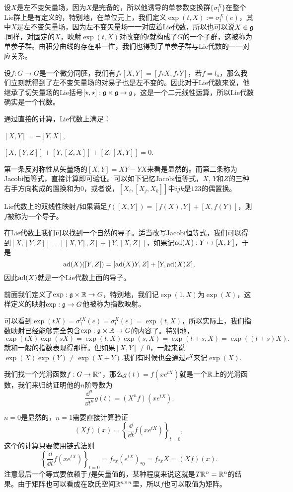 \para 设$X$是左不变矢量场，因为$X$是完备的，所以他诱导的单参数变换群$\{\sigma^X_t\}$在整个Lie群上是有定义的，特别地，在单位元上，我们定义$\exp(t,X):=\sigma^X_t(e)$，其中$X$是左不变矢量场，因为左不变矢量场一一对应着Lie代数，所以也可以说$X\in {\mathfrak{g}}$.同样，对固定的$X$，映射$\exp(t,X)$对改变的$t$就构成了$G$的一个子群，这被称为单参子群。由积分曲线的存在唯一性，我们也得到了单参子群与Lie代数的一一对应关系。

\pro 设$f:G\to G$是一个微分同胚，我们有$f_*[X,Y]=[f_*X,f_*Y]$，若$f=l_a$，那么我们立刻就得到了左不变矢量场的对易子也是左不变的。因此对于Lie代数来说，他继承了切矢量场的Lie括号$[\star,\star]:{\mathfrak{g}}\times {\mathfrak{g}}\to {\mathfrak{g}}$，这是一个二元线性运算，所以Lie代数确实是一个代数。

通过直接的计算，Lie代数上满足：

 $[X,Y]=-[Y,X]$,

 $[X,[Y,Z]]+[Y,[Z,X]]+[Z,[X,Y]]=0$.

第一条反对称性从矢量场的$[X,Y]=XY-YX$来看是显然的。而第二条称为Jacobi恒等式，直接计算即可验证。可以如下记忆Jacobi恒等式，$X$, $Y$和$Z$的三种右手方向构成的置换和为$0$，或者说，$[X_i,[X_j,X_k]]$中$ijk$是$123$的偶置换。

\para Lie代数上的双线性映射$f$如果满足$f([X,Y])=[f(X),Y]+[X,f(Y)]$，则$f$被称为一个导子。

在Lie代数上我们可以找到一个自然的导子。适当改写Jacobi恒等式，我们可以得到$[X,[Y,Z]]=[[X,Y],Z]+[Y,[X,Z]]$，如果记$\operatorname{ad}(X):Y\mapsto [X,Y]$，于是
\[
	\operatorname{ad}(X)([Y,Z])=[\operatorname{ad}(X)Y,Z]+[Y,\operatorname{ad}(X)Z],
\]
因此$\operatorname{ad}(X)$就是一个Lie代数上面的导子。

\para 前面我们定义了$\exp:{\mathfrak{g}}\times \mathbb{R}\to G$，特别地，我们记$\exp(1,X)$为$\exp(X)$，这样定义的映射$\exp:{\mathfrak{g}}\to G$他被称为指数映射。

可以看到$\exp(tX)=\sigma^{tX}_1(e)=\sigma^{X}_t(e)=\exp(t,X)$，所以实际上，我们指数映射已经能够完全包含$\exp:{\mathfrak{g}}\times \mathbb{R}\to G$的内容了。特别地，
\[
	\exp(tX)\exp(sX)=\exp(t,X)\exp(s,X)=\exp(t+s,X)=\exp((t+s)X).
\]
就和一般的指数表现得那样。但如果$[X,Y]\neq 0$，一般来说$\exp(X)\exp(Y)\neq \exp(X+Y)$.我们有时候也会通过$e^{X}$来记$\exp(X)$.

\lem \label{exp}我们找一个光滑函数$f:G\to \mathbb{R}^n$，那么$g(t)=f(xe^{tX})$就是一个$\mathbb{R}$上的光滑函数，我们来归纳证明他的$n$阶导数为
\[
	\frac{\dd^n}{\dd t^n}g(t)=(X^nf)(x e^{tX}).
\]

\proof $n=0$是显然的，$n=1$需要直接计算验证
\[
	(Xf)(x)=\left\{\frac{\dd}{\dd t}f(x e^{tX})\right\}_{t=0},
\]
这个的计算只要使用链式法则
\[
	\left\{\frac{\dd}{\dd t}f(x e^{tX})\right\}_{t=0}=f_{*x}(e^{tX})_{*0}=f_{*x}X=(Xf)(x).
\]
注意最后一个等式要依赖于$f$是矢量值的，某种程度来说这就是$T\mathbb{R}^n=\mathbb{R}^n$的结果。由于矩阵也可以看成在欧氏空间$\mathbb{R}^{n\times n}$里，所以$f$也可以取值为矩阵。

